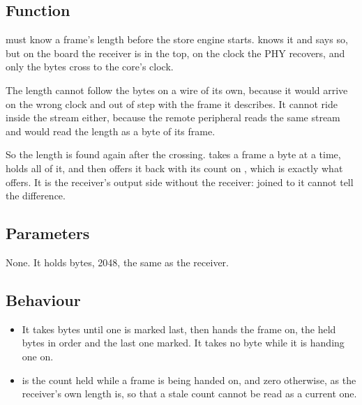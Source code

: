 
%
{}

\subsection*{Function}

 must know a frame's length before the store engine
starts.  knows it and says so, but on the board the
receiver is in the top, on the clock the PHY recovers, and only the
bytes cross to the core's clock.

The length cannot follow the bytes on a wire of its own, because it
would arrive on the wrong clock and out of step with the frame it
describes. It cannot ride inside the stream either, because the remote
peripheral reads the same stream and would read the length as a byte
of its frame.

So the length is found again after the crossing. 
takes a frame a byte at a time, holds all of it, and then offers it
back with its count on , which is exactly what 
offers. It is the receiver's output side without the receiver:
 joined to it cannot tell the difference.

\subsection*{Parameters}

None. It holds  bytes, 2048, the same as the
receiver.


\subsection*{Behaviour}

\begin{itemize}
\item It takes bytes until one is marked last, then hands the frame
on, the held bytes in order and the last one marked. It takes no byte
while it is handing one on.
\item {} is the count held while a frame is being handed on,
and zero otherwise, as the receiver's own length is, so that a stale
count cannot be read as a current one.
\end{itemize}

